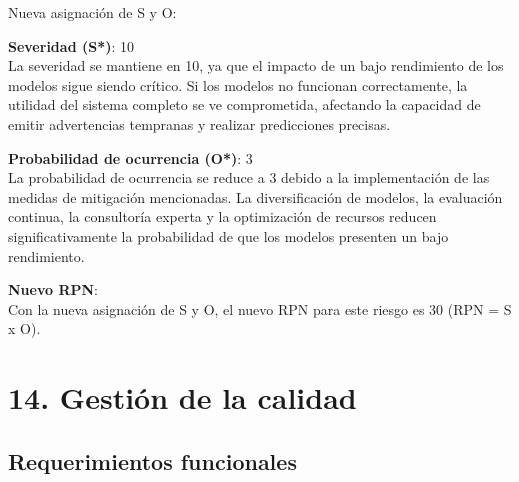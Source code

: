 \documentclass[
11pt, %
codirector, %
]{charter}
\begin{document}
Nueva asignación de S y O:

\textbf{Severidad (S*)}: 10\\
La severidad se mantiene en 10, ya que el impacto de un bajo rendimiento de los modelos sigue siendo crítico. Si los modelos no funcionan correctamente, la utilidad del sistema completo se ve comprometida, afectando la capacidad de emitir advertencias tempranas y realizar predicciones precisas.

\textbf{Probabilidad de ocurrencia (O*)}: 3\\
La probabilidad de ocurrencia se reduce a 3 debido a la implementación de las medidas de mitigación mencionadas. La diversificación de modelos, la evaluación continua, la consultoría experta y la optimización de recursos reducen significativamente la probabilidad de que los modelos presenten un bajo rendimiento.

\textbf{Nuevo RPN}:\\
Con la nueva asignación de S y O, el nuevo RPN para este riesgo es 30 (RPN = S x O).


\section{14. Gestión de la calidad}
\label{sec:calidad}

\subsection{Requerimientos funcionales}
\end{document}
